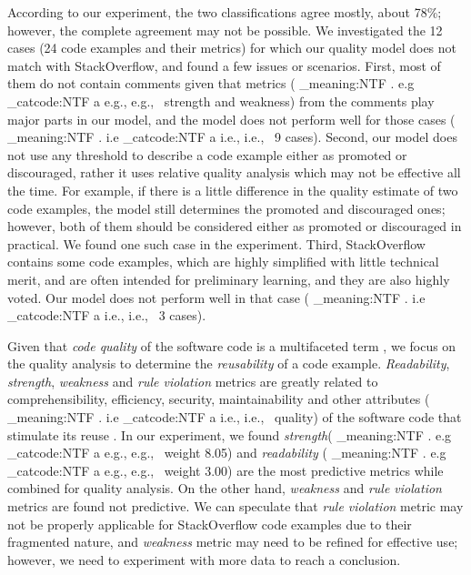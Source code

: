 \documentclass[conference]{IEEEtran}
\makeatletter
\newcommand\latinabbrev[1]{
  \peek_meaning:NTF . {%
    #1\@}%
  { \peek_catcode:NTF a {%
      #1., \@ }%
    {#1., \@}}}
\def\eg{\latinabbrev{e.g}}
\def\ie{\latinabbrev{i.e}}
\makeatother
\begin{document}
According to our experiment,  the two classifications agree mostly, about 78\%; however, the complete agreement may not be possible. We investigated the 12 cases (24 code examples and their metrics) for which our quality model does not match with StackOverflow, and found a few issues or scenarios. First, most of them do not contain comments given that metrics (\eg\ strength and weakness) from the comments play major parts in our model, and the model does not perform well for those cases (\ie\ 9 cases). Second, our model does not use any threshold to describe a code example either as promoted or discouraged, rather it uses relative quality analysis which may not be effective all the time. For example, if there is a little difference in the quality estimate of two code examples, the model still determines the promoted and discouraged ones; however, both of them should be considered either as promoted or discouraged in practical. We found one such case in the experiment. Third, StackOverflow contains some code examples, which are highly simplified with little technical merit, and are often intended for preliminary learning, and they are also highly voted. Our model does not perform well in that case (\ie\ 3 cases). 

Given that \emph{code quality} of the software code is a multifaceted term \cite{survey}, we focus on the quality analysis to determine the \emph{reusability} of a code example. \emph{Readability}, \emph{strength}, \emph{weakness} and \emph{rule violation} metrics are greatly related to comprehensibility, efficiency, security, maintainability and other attributes (\ie\ quality) of the software code that stimulate its reuse \cite{readability}. In our experiment, we found \emph{strength}(\eg\ weight 8.05) and \emph{readability} (\eg\ weight 3.00) are the most predictive metrics while combined for quality analysis. On the other hand, \emph{weakness} and \emph{rule violation} metrics are found not predictive. We can speculate that \emph{rule violation} metric may not be properly applicable for StackOverflow code examples due to their fragmented nature, and \emph{weakness} metric may need to be refined for effective use; however, we need to experiment with more data to reach a conclusion.  
\vspace{-.2cm}
\end{document}
